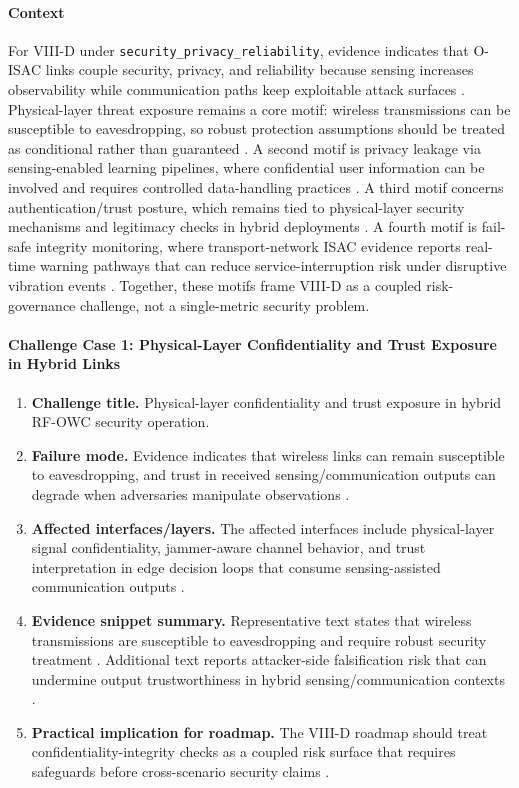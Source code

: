 \documentclass[lettersize,journal]{IEEEtran}
\begin{document}
\paragraph{Context}
For VIII-D under \texttt{security\_privacy\_reliability}, evidence indicates that O-ISAC links couple security, privacy, and reliability because sensing increases observability while communication paths keep exploitable attack surfaces \cite{O_ISAC_145, O_ISAC_039}. Physical-layer threat exposure remains a core motif: wireless transmissions can be susceptible to eavesdropping, so robust protection assumptions should be treated as conditional rather than guaranteed \cite{O_ISAC_145}. A second motif is privacy leakage via sensing-enabled learning pipelines, where confidential user information can be involved and requires controlled data-handling practices \cite{O_ISAC_039}. A third motif concerns authentication/trust posture, which remains tied to physical-layer security mechanisms and legitimacy checks in hybrid deployments \cite{O_ISAC_145}. A fourth motif is fail-safe integrity monitoring, where transport-network ISAC evidence reports real-time warning pathways that can reduce service-interruption risk under disruptive vibration events \cite{O_ISAC_041}. Together, these motifs frame VIII-D as a coupled risk-governance challenge, not a single-metric security problem.

\paragraph{Challenge Case 1: Physical-Layer Confidentiality and Trust Exposure in Hybrid Links}
\begin{enumerate}
    \item \textbf{Challenge title.} Physical-layer confidentiality and trust exposure in hybrid RF-OWC security operation.
    \item \textbf{Failure mode.} Evidence indicates that wireless links can remain susceptible to eavesdropping, and trust in received sensing/communication outputs can degrade when adversaries manipulate observations \cite{O_ISAC_145}.
    \item \textbf{Affected interfaces/layers.} The affected interfaces include physical-layer signal confidentiality, jammer-aware channel behavior, and trust interpretation in edge decision loops that consume sensing-assisted communication outputs \cite{O_ISAC_145}.
    \item \textbf{Evidence snippet summary.} Representative text states that wireless transmissions are susceptible to eavesdropping and require robust security treatment \cite{O_ISAC_145}. Additional text reports attacker-side falsification risk that can undermine output trustworthiness in hybrid sensing/communication contexts \cite{O_ISAC_145}.
    \item \textbf{Practical implication for roadmap.} The VIII-D roadmap should treat confidentiality-integrity checks as a coupled risk surface that requires safeguards before cross-scenario security claims \cite{O_ISAC_145}.
\end{enumerate}
\end{document}
